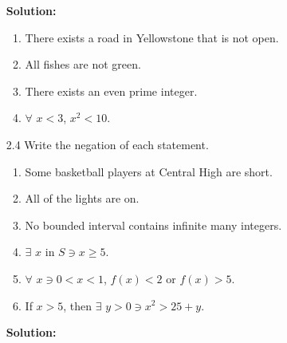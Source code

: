 \begin{enumerate}
      \textbf{Solution:} 

      \begin{enumerate}
         \item There exists a road in Yellowstone that is not open.
         \item All fishes are not green.
         \item There exists an even prime integer.
         \item $\forall$ $x < 3$, $x^2 < 10$.
      \end{enumerate}
   \item[2.4] Write the negation of each statement.
      \begin{enumerate}
         \item Some basketball players at Central High are short.
         \item All of the lights are on.
         \item No bounded interval contains infinite many integers.
         \item $\exists$ $x$ in $S \ni x \ge 5$.
         \item $\forall$ $x \ni 0 < x < 1$, $f(x) < 2$ or $f(x) > 5$.
         \item If $x > 5$, then $\exists$ $y > 0 \ni x^2 > 25 + y$.
      \end{enumerate}

      \textbf{Solution:} 


\end{enumerate}
